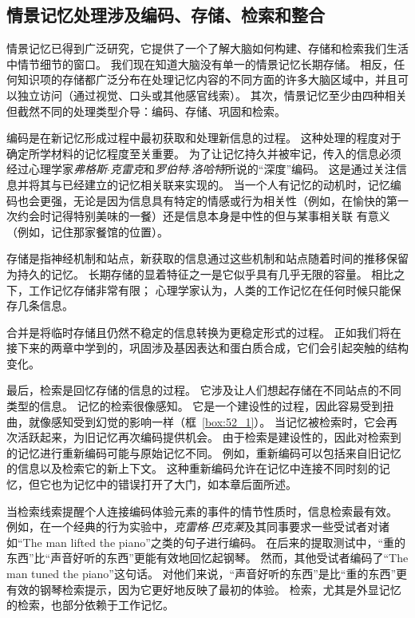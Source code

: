 \subsection{情景记忆处理涉及编码、存储、检索和整合}

情景记忆已得到广泛研究，它提供了一个了解大脑如何构建、存储和检索我们生活中情节细节的窗口。
我们现在知道大脑没有单一的情景记忆长期存储。
相反，任何知识项的存储都广泛分布在处理记忆内容的不同方面的许多大脑区域中，并且可以独立访问（通过视觉、口头或其他感官线索）。
其次，情景记忆至少由四种相关但截然不同的处理类型介导：编码、存储、巩固和检索。


编码是在新记忆形成过程中最初获取和处理新信息的过程。
这种处理的程度对于确定所学材料的记忆程度至关重要。
为了让记忆持久并被牢记，传入的信息必须经过心理学家\textit{弗格斯$\cdot$克雷克}和\textit{罗伯特$\cdot$洛哈特}所说的“深度”编码。
这是通过关注信息并将其与已经建立的记忆相关联来实现的。
当一个人有记忆的动机时，记忆编码也会更强，无论是因为信息具有特定的情感或行为相关性（例如，在愉快的第一次约会时记得特别美味的一餐）还是信息本身是中性的但与某事相关联 有意义（例如，记住那家餐馆的位置）。


存储是指神经机制和站点，新获取的信息通过这些机制和站点随着时间的推移保留为持久的记忆。
长期存储的显着特征之一是它似乎具有几乎无限的容量。
相比之下，工作记忆存储非常有限；
心理学家认为，人类的工作记忆在任何时候只能保存几条信息。


合并是将临时存储且仍然不稳定的信息转换为更稳定形式的过程。
正如我们将在接下来的两章中学到的，巩固涉及基因表达和蛋白质合成，它们会引起突触的结构变化。


最后，检索是回忆存储的信息的过程。
它涉及让人们想起存储在不同站点的不同类型的信息。
记忆的检索很像感知。
它是一个建设性的过程，因此容易受到扭曲，就像感知受到幻觉的影响一样（框~\ref{box:52_1}）。
当记忆被检索时，它会再次活跃起来，为旧记忆再次编码提供机会。
由于检索是建设性的，因此对检索到的记忆进行重新编码可能与原始记忆不同。
例如，重新编码可以包括来自旧记忆的信息以及检索它的新上下文。
这种重新编码允许在记忆中连接不同时刻的记忆，但它也为记忆中的错误打开了大门，如本章后面所述。


当检索线索提醒个人连接编码体验元素的事件的情节性质时，信息检索最有效。
例如，在一个经典的行为实验中，\textit{克雷格$\cdot$巴克莱}及其同事要求一些受试者对诸如“The man lifted the piano”之类的句子进行编码。
在后来的提取测试中，“重的东西”比“声音好听的东西”更能有效地回忆起钢琴。
然而，其他受试者编码了“The man tuned the piano”这句话。
对他们来说，“声音好听的东西”是比“重的东西”更有效的钢琴检索提示，因为它更好地反映了最初的体验。
检索，尤其是外显记忆的检索，也部分依赖于工作记忆。



